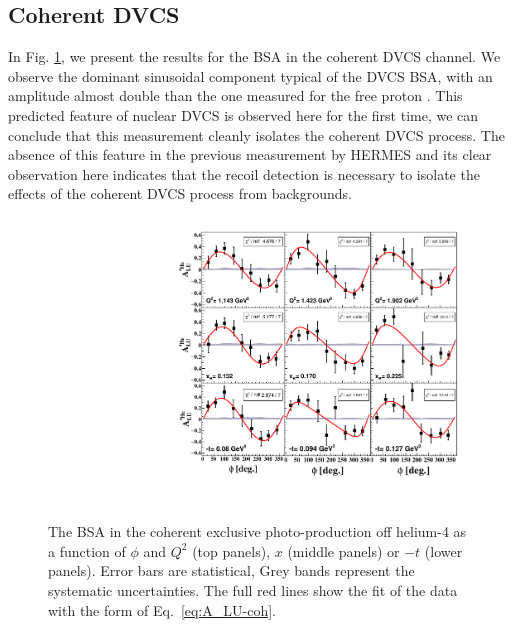 \documentclass{article}
\begin{document}
\subsection{Coherent DVCS}

In Fig. \ref{fig:CohALUphi}, we present the results for the BSA in the coherent DVCS channel. We 
observe the dominant sinusoidal component typical of the DVCS BSA, with an amplitude almost 
double than the one measured for the free proton \cite{Jo:2015ema}. This 
predicted feature of nuclear DVCS \cite{Guzey:2003jh} is observed here for the first time, we
can conclude that this measurement cleanly isolates the coherent DVCS process. The absence of 
this feature in the previous measurement by HERMES \cite{Airapetian:2009cga} and its clear observation here indicates that the recoil 
detection is necessary to isolate the effects of the coherent DVCS process from backgrounds. 

\begin{figure}[bp!]
\center
\includegraphics[width=12cm]{fig3/Coherent_ALU_phi.pdf}
	\caption{The BSA in the coherent exclusive photo-production off helium-4 as a 
	function of $\phi$ and $Q^2$ 
	(top panels), $x$ (middle panels) or $-t$ (lower panels). Error bars are  
	statistical, Grey bands represent the systematic uncertainties. The full red lines show
	the fit of the data with the form of Eq.~\ref{eq:A_LU-coh}.}
\label{fig:CohALUphi}
\end{figure}
\end{document}
